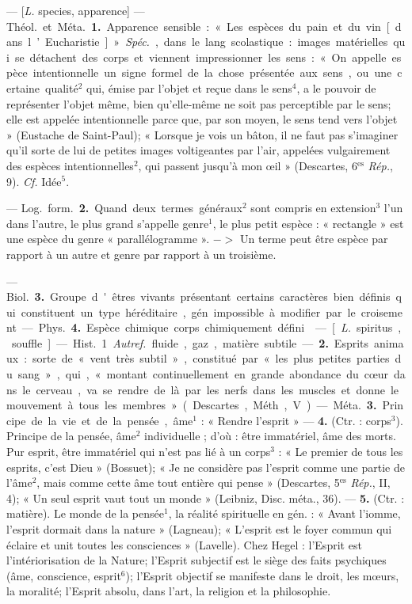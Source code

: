 \begin{itemize}[leftmargin=1cm, label=, itemsep=1pt]
 — [{\it L.} species, apparence] —
\si{Théol.} et \si{Méta.} {\bf 1.} Apparence sensible : « Les espèces du pain et du
vin [dans l’Eucharistie] ». {\it Spéc.},
dans le lang. scolastique : images
matérielles qui se détachent des
corps et viennent impressionner les
sens : « On appelle espèce intentionnelle un signe formel de la chose
présentée aux sens, ou une certaine
qualité$^2$ qui, émise par l'objet et
reçue dans le sens$^4$, a le pouvoir de
représenter l’objet même, bien
qu'elle-même ne soit pas perceptible par le sens; elle est appelée
intentionnelle parce que, par son
moyen, le sens tend vers l’objet »
(Eustache de Saint-Paul); « Lorsque
je vois un bâton, il ne faut pas
s’imaginer qu'il sorte de lui de petites images voltigeantes par l’air,
appelées vulgairement des espèces
intentionnelles$^2$, qui passent jusqu’à
mon œil » (Descartes, 6$^\text{es}$ {\it Rép.}, 9).
{\it Cf.} Idée$^5$.

— \si{Log.} \si{form.} {\bf 2.} Quand deux termes
généraux$^2$ sont compris en extension$^3$ l’un dans l’autre, le plus grand
s'appelle genre$^1$, le plus petit espèce :
« rectangle » est une espèce du genre
« parallélogramme ». $->$ Un terme
peut être espèce par rapport à un
autre et genre par rapport à un troisième.

— \si{Biol.} {\bf 3.} Groupe d'êtres vivants
présentant certains caractères bien
définis qui constituent un type
héréditaire, gén. impossible à modifier par le croisement.

— \si{Phys.} {\bf 4.} Espèce chimique
corps chimiquement défini.

 — [{\it L.} spiritus, souffle] — \si{Hist.}
1. {\it Autref.} fluide, gaz, matière
subtile. — {\bf 2.} Esprits animaux : sorte
de « vent très subtil », constitué
par « les plus petites parties du
sang », qui, « montant continuellement en grande abondance du
cœur dans le cerveau, va se rendre
de là par les nerfs dans les muscles
et donne le mouvement à tous les
membres » (Descartes, Méth., V).

— \si{Méta.} {\bf 3.} Principe de la vie et de
la pensée, âme$^1$ : « Rendre l'esprit »
— {\bf 4.} (Ctr. : corps$^3$). Principe de la
pensée, âme$^2$ individuelle ; d'où :
être immatériel, âme des morts.
Pur esprit, être immatériel qui n’est
pas lié à un corps$^3$ : « Le premier de
tous les esprits, c’est Dieu » (Bossuet); « Je ne considère pas l'esprit
comme une partie de l'âme$^2$, mais
comme cette âme tout entière qui
pense » (Descartes, 5$^\text{es}$ {\it Rép.}, II, 4);
« Un seul esprit vaut tout un monde »
(Leibniz, Disc. méta., 36). — {\bf 5.} (Ctr. :
matière). Le monde de la pensée$^1$, la
réalité spirituelle en gén. : « Avant
l’iomme, l'esprit dormait dans la
nature » (Lagneau); « L'esprit est
le foyer commun qui éclaire et unit
toutes les consciences » (Lavelle).
Chez Hegel : l'Esprit est l’intériorisation
de la Nature; l'Esprit subjectif est le siège des faits psychiques
(âme, conscience, esprit$^6$); l'Esprit
objectif se manifeste dans le droit,
les mœurs, la moralité; l'Esprit
absolu, dans l’art, la religion et la
philosophie.


\end{itemize}
